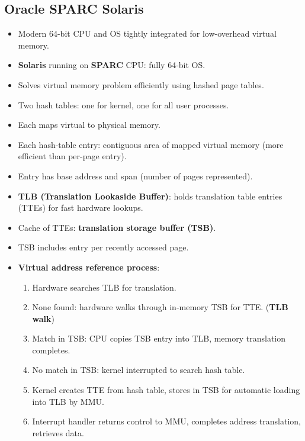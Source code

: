\subsection{Oracle SPARC Solaris}
\begin{itemize}
    \item Modern 64-bit CPU and OS tightly integrated for low-overhead virtual memory.
    \item \textbf{Solaris} running on \textbf{SPARC} CPU: fully 64-bit OS.
    \item Solves virtual memory problem efficiently using hashed page tables.
    \item Two hash tables: one for kernel, one for all user processes.
    \item Each maps virtual to physical memory.
    \item Each hash-table entry: contiguous area of mapped virtual memory (more efficient than per-page entry).
    \item Entry has base address and span (number of pages represented).
    \item \textbf{TLB (Translation Lookaside Buffer)}: holds translation table entries (TTEs) for fast hardware lookups.
    \item Cache of TTEs: \textbf{translation storage buffer (TSB)}.
    \item TSB includes entry per recently accessed page.
    \item \textbf{Virtual address reference process}:
    \begin{enumerate}
        \item Hardware searches TLB for translation.
        \item None found: hardware walks through in-memory TSB for TTE. (\textbf{TLB walk})
        \item Match in TSB: CPU copies TSB entry into TLB, memory translation completes.
        \item No match in TSB: kernel interrupted to search hash table.
        \item Kernel creates TTE from hash table, stores in TSB for automatic loading into TLB by MMU.
        \item Interrupt handler returns control to MMU, completes address translation, retrieves data.
    \end{enumerate}
\end{itemize}

\vspace{1em}
